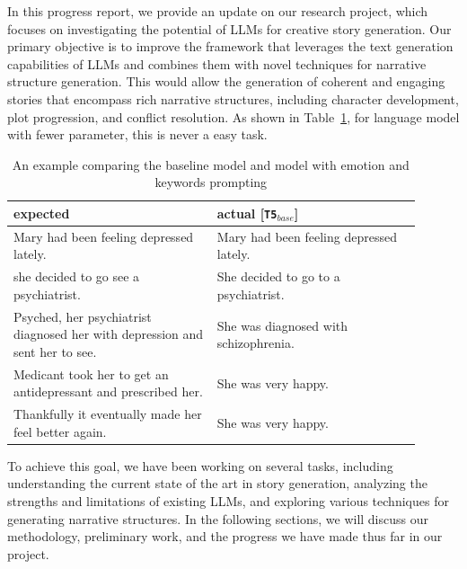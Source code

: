 \documentclass[letterpaper]{article}
\begin{document}
In this progress report, we provide an update on our research project, which focuses on investigating the potential of LLMs for creative story generation. Our primary objective is to improve the framework that leverages the text generation capabilities of LLMs and combines them with novel techniques for narrative structure generation. This would allow the generation of coherent and engaging stories that encompass rich narrative structures, including character development, plot progression, and conflict resolution. As shown in Table~\ref{storyExampleII}, for language model with fewer parameter, this is never a easy task.

\begin{table}[h]
    \centering
    \begin{tabular}{p{0.45\linewidth}|p{0.45\linewidth}}
    \textbf{expected}                & \textbf{actual [\texttt{T5$_{base}$}]}                \\ \hline
    Mary had been feeling depressed lately.                        & Mary had been feeling depressed lately. \\ \hline
    she decided to go see a psychiatrist.                          & She decided to go to a psychiatrist.    \\ \hline
    Psyched, her psychiatrist diagnosed her with depression and sent her to see. & She was diagnosed with schizophrenia. \\ \hline
    Medicant took her to get an antidepressant and prescribed her. & She was very happy.                     \\ \hline
    Thankfully it eventually made her feel better again.           & She was very happy.                    
    \end{tabular}%
    \caption{An example comparing the baseline model and model with emotion and keywords prompting}
    \label{storyExampleII}
\end{table}

To achieve this goal, we have been working on several tasks, including understanding the current state of the art in story generation, analyzing the strengths and limitations of existing LLMs, and exploring various techniques for generating narrative structures. In the following sections, we will discuss our methodology, preliminary work, and the progress we have made thus far in our project.
\end{document}
